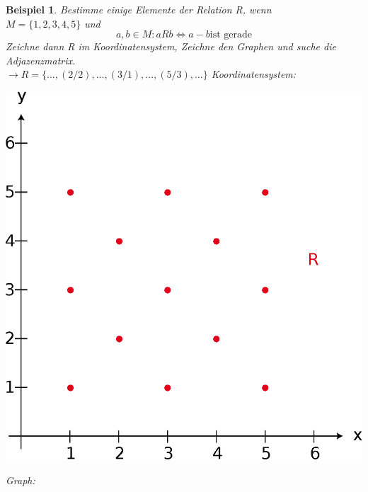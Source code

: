 \documentclass{report}
\newtheorem{myexample}{Beispiel}
\begin{document}
\begin{myexample}Bestimme einige Elemente der Relation R, wenn\\
$M = \{1, 2, 3, 4, 5\}$ und
\begin{equation}a,b \in M: a R b \iff a - b \mbox{ist gerade}\end{equation}
Zeichne dann R im Koordinatensystem, Zeichne den Graphen und suche die Adjazenzmatrix.\\
$\to R = \{..., (2/2), ..., (3/1), ..., (5/3), ...\}$
Koordinatensystem:
\begin{center}\includegraphics[scale=0.25]{img/3_1-r-cartesian-grid.eps}\end{center}
Graph:

\end{myexample}
\end{document}
